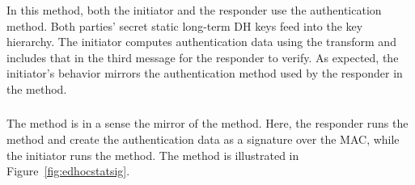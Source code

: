 \subsubsection{\mStatStat}
In this method, both the initiator and the responder use the \mStat{}
authentication method.
%
Both parties' secret static long-term DH keys feed into the key hierarchy.
%
The initiator computes authentication data using the \mAead{} transform
and includes that in the third message for the responder to verify.
%
As expected, the initiator's behavior mirrors the \mStat{} authentication method used by the responder in the \mSigStat{} method.
%

\spacehack
\subsubsection{\mStatSig}
The \mStatSig{} method is in a sense the mirror of the \mSigStat{} method.
%
Here, the responder runs the \mSig{} method and create the \mAuthr{}
authentication data as a signature over the MAC, while the initiator runs the \mStat{} method.
%
The method is illustrated in Figure~\ref{fig:edhocstatsig}.
%


